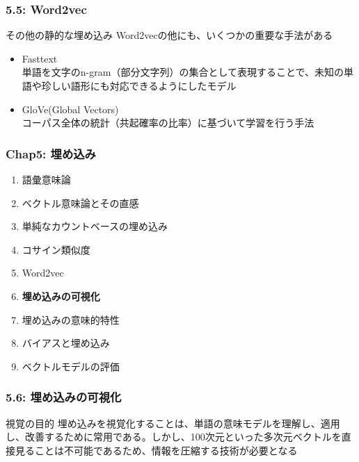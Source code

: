 \documentclass[unicode,11pt]{beamer} %
\begin{document}
\begin{frame}
    \frametitle{5.5: Word2vec}
    \begin{alertblock}{その他の静的な埋め込み}
        Word2vecの他にも、いくつかの重要な手法がある
        \begin{itemize}
            \item Fasttext\\単語を文字のn-gram（部分文字列）の集合として表現することで、未知の単語や珍しい語形にも対応できるようにしたモデル
            \item GloVe(Global Vectors)\\コーパス全体の統計（共起確率の比率）に基づいて学習を行う手法
        \end{itemize}
    \end{alertblock}
\end{frame}


\begin{frame}
    \frametitle{Chap5: 埋め込み}
    \begin{block}{}
        \begin{enumerate}
            \item 語彙意味論
            \item ベクトル意味論とその直感
            \item 単純なカウントベースの埋め込み
            \item コサイン類似度
            \item Word2vec
            \item {\color{red}\textbf{埋め込みの可視化}}
            \item 埋め込みの意味的特性
            \item バイアスと埋め込み
            \item ベクトルモデルの評価
        \end{enumerate}
    \end{block}
\end{frame}

\begin{frame}
    \frametitle{5.6: 埋め込みの可視化}
    \begin{alertblock}{視覚の目的}
        埋め込みを視覚化することは、単語の意味モデルを理解し、適用し、改善するために常用である。しかし、100次元といった多次元ベクトルを直接見ることは不可能であるため、情報を圧縮する技術が必要となる
    \end{alertblock}
\end{frame}
\end{document}
